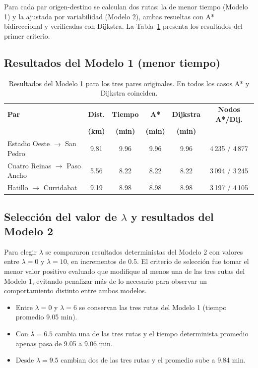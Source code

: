 \documentclass[11pt]{article}
\numberwithin{equation}{section}
\begin{document}
Para cada par origen-destino se calculan dos rutas: la de menor tiempo (Modelo 1) y la ajustada por variabilidad (Modelo 2), ambas resueltas con A* bidireccional y verificadas con Dijkstra. La Tabla~\ref{tab:modelo1} presenta los resultados del primer criterio.

\subsection{Resultados del Modelo 1 (menor tiempo)}

\begin{table}[h!]
\centering
\small
\begin{tabularx}{\textwidth}{>{\raggedright\arraybackslash}X c c c c c}
\toprule
\textbf{Par} & \textbf{Dist.} & \textbf{Tiempo} & \textbf{A*} & \textbf{Dijkstra} & \textbf{Nodos A*/Dij.} \\
 & \textbf{(km)} & \textbf{(min)} & \textbf{(min)} & \textbf{(min)} & \\
\midrule
Estadio Oeste $\to$ San Pedro & 9.81 & 9.96 & 9.96 & 9.96 & 4\,235 / 4\,877 \\
Cuatro Reinas $\to$ Paso Ancho & 5.56 & 8.22 & 8.22 & 8.22 & 3\,094 / 3\,245 \\
Hatillo $\to$ Curridabat & 9.19 & 8.98 & 8.98 & 8.98 & 3\,197 / 4\,105 \\
\bottomrule
\end{tabularx}
\caption{Resultados del Modelo 1 para los tres pares originales. En todos los casos A* y Dijkstra coinciden.}
\label{tab:modelo1}
\end{table}

\subsection{Selección del valor de \texorpdfstring{$\lambda$}{lambda} y resultados del Modelo 2}\label{subsec:modelo2res}

Para elegir $\lambda$ se compararon resultados deterministas del Modelo 2 con valores entre $\lambda=0$ y $\lambda=10$, en incrementos de 0.5. El criterio de selección fue tomar el menor valor positivo evaluado que modifique al menos una de las tres rutas del Modelo 1, evitando penalizar más de lo necesario para observar un comportamiento distinto entre ambos modelos.

\begin{itemize}
    \item Entre $\lambda=0$ y $\lambda=6$ se conservan las tres rutas del Modelo 1 (tiempo promedio 9.05 min).
    \item Con $\lambda=6.5$ cambia una de las tres rutas y el tiempo determinista promedio apenas pasa de 9.05 a 9.06 min.
    \item Desde $\lambda=9.5$ cambian dos de las tres rutas y el promedio sube a 9.84 min.
\end{itemize}
\end{document}
